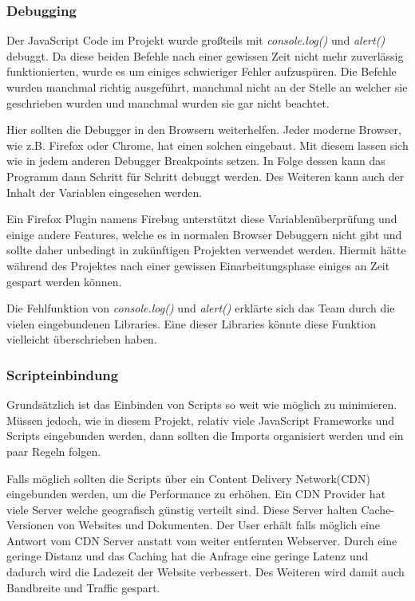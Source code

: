\newpage

\subsubsection{Debugging}
Der JavaScript Code im Projekt wurde großteils mit \textit{console.log()} und \textit{alert()} debuggt. Da diese beiden Befehle nach einer gewissen Zeit nicht mehr zuverlässig funktionierten, wurde es um einiges schwieriger Fehler aufzuspüren. Die Befehle wurden manchmal richtig ausgeführt, manchmal nicht an der Stelle an welcher sie geschrieben wurden und manchmal wurden sie gar nicht beachtet. 

Hier sollten die Debugger in den Browsern weiterhelfen. Jeder moderne Browser, wie z.B. Firefox oder Chrome, hat einen solchen eingebaut. Mit diesem lassen sich wie in jedem anderen Debugger Breakpoints setzen. In Folge dessen kann das Programm dann Schritt für Schritt debuggt werden. Des Weiteren kann auch der Inhalt der Variablen eingesehen werden. 

Ein Firefox Plugin namens Firebug unterstützt diese Variablenüberprüfung und einige andere Features, welche es in normalen Browser Debuggern nicht gibt und sollte daher unbedingt in zukünftigen Projekten verwendet werden. Hiermit hätte während des Projektes nach einer gewissen Einarbeitungsphase einiges an Zeit gespart werden können. \cite{FIREBUGJS} 


Die Fehlfunktion von \textit{console.log()} und \textit{alert()} erklärte sich das Team durch die vielen eingebundenen Libraries. Eine dieser Libraries könnte diese Funktion vielleicht überschrieben haben.

\newpage

\subsubsection{Scripteinbindung}
Grundsätzlich ist das Einbinden von Scripts so weit wie möglich zu minimieren. Müssen jedoch, wie in diesem Projekt, relativ viele JavaScript Frameworks und Scripts eingebunden werden, dann sollten die Imports organisiert werden und ein paar Regeln folgen.

Falls möglich sollten die Scripts über ein Content Delivery Network(CDN) eingebunden werden, um die Performance zu erhöhen. Ein CDN Provider hat viele Server welche geografisch günstig verteilt sind. Diese Server halten Cache-Versionen von Websites und Dokumenten. Der User erhält falls möglich eine Antwort vom CDN Server anstatt vom weiter entfernten Webserver. Durch eine geringe Distanz und das Caching hat die Anfrage eine geringe Latenz und dadurch wird die Ladezeit der Website verbessert. Des Weiteren wird damit auch Bandbreite und Traffic gespart. \cite{CDN1}

